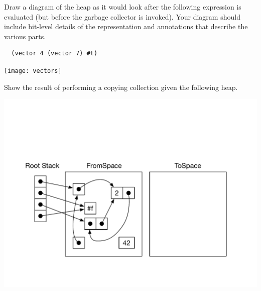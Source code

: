 \documentclass[12pt,answers]{exam}
\begin{document}
\begin{questions}


\question[10] Draw a diagram of the heap as it would look after the
following expression is evaluated (but before the garbage collector is
invoked). Your diagram should include bit-level details of the
representation and annotations that describe the various parts.
\begin{lstlisting}
  (vector 4 (vector 7) #t)
\end{lstlisting}

\begin{solution}[4in]

\texttt{[image: vectors]}
\end{solution}

\question[10] Show the result of performing a copying collection given
the following heap.

\includegraphics[width=7in]{copy-collect}


\begin{solution}

\end{solution}

\end{questions}
\end{document}
